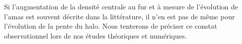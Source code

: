 
		Si l'augmentation de la densité centrale au fur et à mesure de l'évolution de l'amas est souvent décrite
		dans la littérature, il n'en est pas de même pour l'évolution de la pente du halo. Nous tenterons de
		préciser ce constat observationnel lors de nos études théoriques et numériques.


		

















